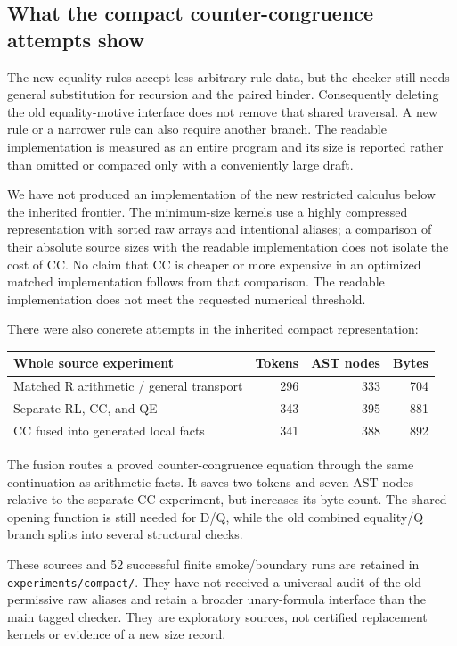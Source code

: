 \documentclass[11pt,letterpaper]{article}
\theoremstyle{definition}\newtheorem{definition}[theorem]{Definition}
\theoremstyle{remark}\newtheorem{remark}[theorem]{Remark}
\newcommand{\file}[1]{{\small\nolinkurl{#1}}}
\begin{document}
\subsection{What the compact counter-congruence attempts show}

The new equality rules accept less arbitrary rule data, but the checker
still needs general substitution for recursion and the paired binder.
Consequently deleting the old equality-motive interface does not remove
that shared traversal. A new rule or a narrower rule can also require
another branch. The readable implementation is measured as an entire
program and its size is reported rather than omitted or compared only
with a conveniently large draft.

We have not produced an implementation of the new restricted calculus
below the inherited frontier. The minimum-size kernels use a highly compressed
representation with sorted raw arrays and intentional aliases; a
comparison of their absolute source sizes with the readable implementation
does not isolate the cost of CC. No claim that CC is cheaper or more
expensive in an optimized matched implementation follows from that
comparison. The readable implementation does not meet the requested
numerical threshold.

There were also concrete attempts in the inherited compact representation:
\begin{center}\small
\begin{tabular}{lrrr}
\toprule
Whole source experiment & Tokens & AST nodes & Bytes\\
\midrule
Matched R arithmetic / general transport &296&333&704\\
Separate RL, CC, and QE &343&395&881\\
CC fused into generated local facts &341&388&892\\
\bottomrule
\end{tabular}
\end{center}
The fusion routes a proved counter-congruence equation through the same
continuation as arithmetic facts. It saves two tokens and seven AST nodes
relative to the separate-CC experiment, but increases its byte count.
The shared opening function is still needed for D/Q, while the old combined
equality/Q branch splits into several structural checks.

These sources and 52 successful finite smoke/boundary runs are retained
in \file{experiments/compact/}. They have not received a universal audit
of the old permissive raw aliases and retain a broader unary-formula
interface than the main tagged checker. They are exploratory sources,
not certified replacement kernels or evidence of a new size record.
\end{document}
